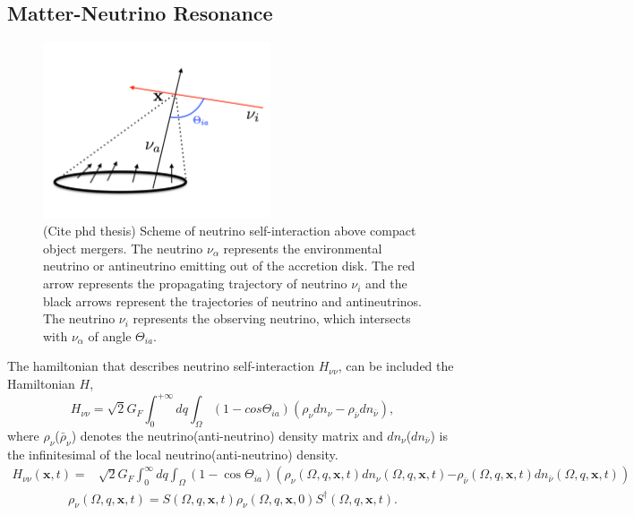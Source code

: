\documentclass[
reprint,
preprintnumbers,
 amsmath,
 amssymb,
 aps,
onecolumn,
prd,
]{revtex4-2}
\begin{document}
\subsection{Matter-Neutrino Resonance}
\begin{figure}[!h]
  \centering
  \includegraphics[width=0.6\textwidth]{neutrinointeraction.pdf}
  \caption{\label{fig:neutrinointeraction}
  (Cite phd thesis)
  Scheme of neutrino self-interaction above compact object mergers.
  The neutrino $\nu_\alpha$ represents the environmental neutrino or antineutrino emitting out of the accretion disk. 
  The red arrow represents the propagating trajectory of neutrino $\nu_i$ and the black arrows represent the trajectories of neutrino and antineutrinos.
  The neutrino $\nu_i$ represents the observing neutrino, which intersects with $\nu_\alpha$ of angle $\Theta_{ia}$. 
  }
\end{figure}
The hamiltonian that describes neutrino self-interaction $H_{\nu\nu}$, can be included the Hamiltonian $H$,
\begin{equation}
H_{\nu\nu} =\sqrt{2}G_F \int_0^{+\infty} dq \int_\Omega (1- cos{\Theta_{ia}}) (\rho_\nu d n_\nu - \rho_{\bar{\nu}} d n_{\bar{\nu}}),
\end{equation} 
where $\rho_\nu$($\bar{\rho}_\nu$) denotes the neutrino(anti-neutrino) density matrix and $d n_\nu$($d n_{\bar{\nu}}$) is the infinitesimal of the local neutrino(anti-neutrino) density.
\begin{equation}
\begin{aligned} 
H_{\nu \nu}(\mathbf{x}, t)
=& \sqrt{2} G_{F} \int_{0}^{\infty} d q \int_{\Omega}\left(1-\cos \Theta_{ia}\right) \left(\rho_{\nu}(\Omega, q, \mathbf{x}, t) d n_{\nu}(\Omega, q, \mathbf{x}, t)\right. \left.-\rho_{\bar{\nu}}(\Omega, q, \mathbf{x}, t) d n_{\bar{\nu}}(\Omega, q, \mathbf{x}, t)\right) 
\end{aligned}
\end{equation}
\begin{equation}
\begin{array}{l}
\rho_{\nu}(\Omega, q, \mathbf{x}, t)= S(\Omega, q, \mathbf{x}, t) \rho_{\nu}(\Omega, q, \mathbf{x}, 0) S^{\dagger}(\Omega, q, \mathbf{x}, t) . 
\end{array}
\end{equation}
\end{document}
